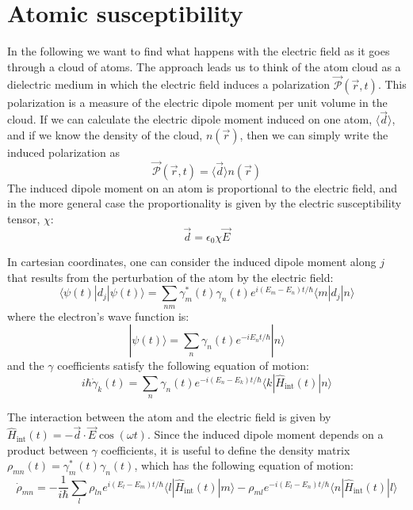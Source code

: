 \documentclass{article}[12pt]
\begin{document}
\section{Atomic susceptibility}

In the following we want to find what happens with the electric field as it goes through a cloud of atoms.   The approach leads us to think of the atom cloud as a dielectric medium in which the electric field induces a polarization $\vec{\mathcal{P}}(\vec{r}, t)$.   This polarization is a measure of the electric dipole moment per unit volume in the cloud.  If we can calculate the electric dipole moment induced on one atom, $\langle \vec{d} \rangle$, and if we know the density of the cloud, $n(\vec{r})$, then we can simply write the induced polarization as 
\[ \vec{\mathcal{P}}(\vec{r}, t) =  \langle \vec{d} \rangle n(\vec{r}) \]
The induced dipole moment on an atom is proportional to the electric field, and in the more general case the proportionality is given by the electric susceptibility tensor,  $\chi$:
\[ \vec{d} = \epsilon_{0}\chi \vec{E}\]

In cartesian coordinates, one can consider the induced dipole moment along $j$ that results from the perturbation of the atom by the electric field:
\begin{equation}
 \langle\psi(t)| d_{j} | \psi(t) \rangle = \sum_{nm}\gamma_{m}^{*}(t)\gamma_{n}(t) e^{i(E_{m}-E_{n})t/\hbar}\langle m|d_{j}|n\rangle
 \label{eq:dipolemoment}
\end{equation}
where the  electron's wave function is:
\[  | \psi(t)\rangle = \sum_{n}\gamma_{n}(t) e^{-iE_{n}t/\hbar}|n\rangle\]
and the $\gamma$ coefficients satisfy the following equation of motion:
\[ i \hbar \dot{\gamma}_{k}(t) = \sum_{n} \gamma_{n}(t)e^{-i(E_{n}-E_{k})t/\hbar} \langle k | \hat{H}_{\mathrm{int}}(t) | n \rangle \]

The interaction between the atom and the electric field is given by $\hat{H}_{\mathrm{int}}(t)  = -\vec{d}\cdot\vec{E} \cos( \omega t )$.  Since the induced dipole moment depends on a product between $\gamma$ coefficients, it is useful to define the density matrix $\rho_{mn} (t) =  \gamma_{m}^{*}(t)\gamma_{n}(t)$, which has the following equation of motion:
\[ \dot{\rho}_{mn} =- \frac{1}{i\hbar} \sum_{l} \rho_{ln} e^{i(E_{l}-E_{m})t/\hbar} \langle l | \hat{H}_{\mathrm{int}}(t) | m \rangle - \rho_{ml} e^{-i(E_{l}-E_{n})t/\hbar} \langle n | \hat{H}_{\mathrm{int}}(t) | l \rangle \]
\end{document}
